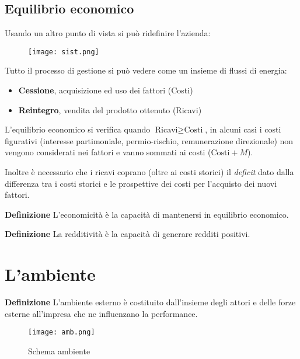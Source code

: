 \documentclass{article}
\newcommand{\df}{\noindent\textbf{Definizione }}
\begin{document}
\subsection{Equilibrio economico}

Usando un altro punto di vista si può ridefinire l'azienda:\newline

\begin{figure}[ht]
    \centering
    \texttt{[image: sist.png]}
\end{figure}

\noindent Tutto il processo di gestione si può vedere come un insieme di flussi di energia:
\begin{itemize}
    \item \textbf{Cessione}, acquisizione ed uso dei fattori (Costi)
    \item \textbf{Reintegro}, vendita del prodotto ottenuto (Ricavi)\newline
\end{itemize}

\noindent L'equilibrio economico si verifica quando $\text{Ricavi}\geq\text{Costi}$, in alcuni casi i costi figurativi (interesse partimoniale, permio-rischio, remunerazione direzionale) non vengono considerati nei fattori e vanno sommati ai costi ($\text{Costi}+M$).\newline

\noindent Inoltre è necessario che i ricavi coprano (oltre ai costi storici) il \textit{deficit} dato dalla differenza tra i costi storici e le prospettive dei costi per l'acquisto dei nuovi fattori.\newline

\df L'economicità è la capacità di mantenersi in equilibrio economico.\newline

\df La redditività è la capacità di generare redditi positivi.

\newpage

\section{L'ambiente}

\df L'ambiente esterno è costituito dall’insieme degli attori e delle forze esterne all’impresa che ne influenzano la performance.\newline

\begin{figure}[ht]
    \centering
    \texttt{[image: amb.png]}
    \caption{Schema ambiente}
\end{figure}
\end{document}
